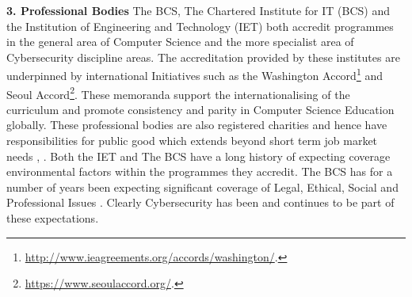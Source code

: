 \documentclass[conference]{IEEEtran}
\begin{document}
\textbf{3. Professional Bodies}
The BCS, The Chartered Institute for IT (BCS) and the Institution of Engineering and Technology (IET) both accredit programmes in the general area of Computer Science and the more specialist area of Cybersecurity discipline areas. The accreditation provided by these institutes are underpinned by international Initiatives such as the Washington Accord\footnote{\url{http://www.ieagreements.org/accords/washington/}.} and Seoul Accord\footnote{\url{https://www.seoulaccord.org/}.}. These memoranda support the internationalising of the curriculum and promote consistency and parity in Computer Science Education globally.   These professional bodies are also registered charities and hence have responsibilities for public good which extends beyond short term job market needs \cite{Stensaker2006}, \cite{Mutereko2017}. Both the IET and The BCS have a long history of expecting coverage environmental factors within the programmes they accredit. The BCS has for a number of years been expecting significant coverage of Legal, Ethical, Social and Professional Issues \cite{Brooke2018}. Clearly Cybersecurity has been and continues to be part of these expectations. 
\end{document}
